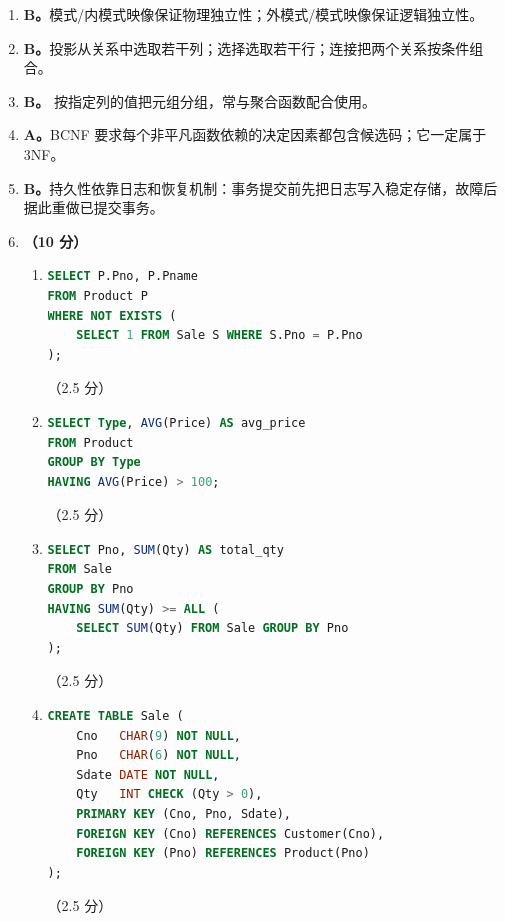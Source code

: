 \documentclass[a4paper,11pt]{article}
\begin{document}
\begin{enumerate}[start=21, label=\textbf{\arabic*.}, leftmargin=2.4em, itemsep=0.45em]

\item \textbf{B。}模式/内模式映像保证物理独立性；外模式/模式映像保证逻辑独立性。

\item \textbf{B。}投影从关系中选取若干列；选择选取若干行；连接把两个关系按条件组合。

\item \textbf{B。} 按指定列的值把元组分组，常与聚合函数配合使用。

\item \textbf{A。}BCNF 要求每个非平凡函数依赖的决定因素都包含候选码；它一定属于 3NF。

\item \textbf{B。}持久性依靠日志和恢复机制：事务提交前先把日志写入稳定存储，故障后据此重做已提交事务。

\item \textbf{（10 分）}
\begin{enumerate}[label=（\arabic*）, leftmargin=2.2em, itemsep=2pt]
  \item
\begin{lstlisting}[language=SQL]
SELECT P.Pno, P.Pname
FROM Product P
WHERE NOT EXISTS (
    SELECT 1 FROM Sale S WHERE S.Pno = P.Pno
);
\end{lstlisting}
\hfill（2.5 分）
  \item
\begin{lstlisting}[language=SQL]
SELECT Type, AVG(Price) AS avg_price
FROM Product
GROUP BY Type
HAVING AVG(Price) > 100;
\end{lstlisting}
\hfill（2.5 分）
  \item
\begin{lstlisting}[language=SQL]
SELECT Pno, SUM(Qty) AS total_qty
FROM Sale
GROUP BY Pno
HAVING SUM(Qty) >= ALL (
    SELECT SUM(Qty) FROM Sale GROUP BY Pno
);
\end{lstlisting}
\hfill（2.5 分）
  \item
\begin{lstlisting}[language=SQL]
CREATE TABLE Sale (
    Cno   CHAR(9) NOT NULL,
    Pno   CHAR(6) NOT NULL,
    Sdate DATE NOT NULL,
    Qty   INT CHECK (Qty > 0),
    PRIMARY KEY (Cno, Pno, Sdate),
    FOREIGN KEY (Cno) REFERENCES Customer(Cno),
    FOREIGN KEY (Pno) REFERENCES Product(Pno)
);
\end{lstlisting}
\hfill（2.5 分）
\end{enumerate}


\end{enumerate}
\end{document}
